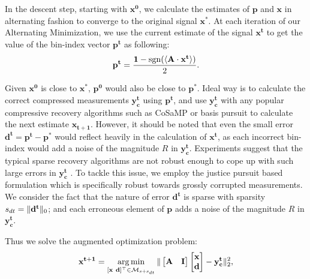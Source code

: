 In the descent step, starting with $\mathbf{{x}^0}$, we calculate the estimates of $\mathbf{p}$ and $\mathbf{x}$ in alternating fashion to converge to the original signal $\mathbf{x^*}$. At each iteration of our Alternating Minimization, we use the current estimate of the signal ${\mathbf{x^t}}$ to get the value of the bin-index vector $\mathbf{{p}^t}$ as following:
\begin{equation}
\mathbf{{p}^{t}} = \frac{\mathbf{1}-\mathrm{sgn}(\langle \mathbf{A} \cdot \mathbf{x^t} \rangle)}{2}.
\label{step1}
\end{equation}

Given $\mathbf{x^0}$ is close to $\mathbf{x^*}$, $\mathbf{p^0}$ would also be close to $\mathbf{p^*}$. Ideal way is to calculate the correct compressed measurements $\mathbf{y^t_c}$ using $\mathbf{p^t}$, and use $\mathbf{y^t_c}$ with any popular compressive recovery algorithms such as CoSaMP or basis pursuit to calculate the next estimate $\mathbf{{x}_{t+1}}$. 
%
%
However, it should be noted that even the small error $\mathbf{d^t} = \mathbf{p^t - p^*}$ would reflect heavily in the calculation of $\mathbf{x^t}$, as each incorrect bin-index would add a noise of the magnitude $R$ in $\mathbf{y^t_c}$. Experiments suggest that the typical sparse recovery algorithms are not robust enough to cope up with such large errors in $\mathbf{y^t_c}$ \cite{Laska2009}. To tackle this issue, we employ the justice pursuit based formulation which is specifically robust towards grossly corrupted measurements. We consider the fact that the nature of error $\mathbf{d^t}$ is sparse with sparsity $s_{dt}=\|\mathbf{d^t}\|_0$; and each erroneous element of $\mathbf{p}$ adds a noise of the magnitude $R$ in $\mathbf{y^t_c}$.

Thus we solve the augmented optimization problem:
$$
\mathbf{{x}^{t+1}}=\argmin_{[\mathbf{x~d}]^\t \in \mathcal{M}_{s+s_{dt}}}\norm{\begin{bmatrix} \mathbf{A} & \mathbf{I} \end{bmatrix} \begin{bmatrix} \mathbf{x} \\ \mathbf{d} \end{bmatrix} - \mathbf{y^t_c}}_2^2, %
$$

